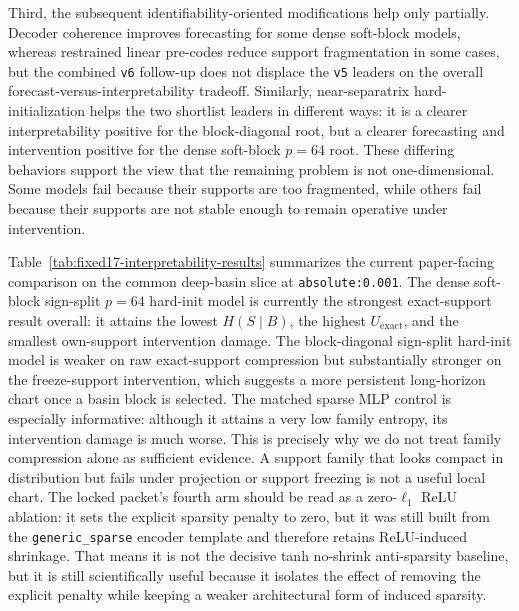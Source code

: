 Third, the subsequent identifiability-oriented modifications help only
partially. Decoder coherence improves forecasting for some dense soft-block
models, whereas restrained linear pre-codes reduce support fragmentation in
some cases, but the combined \texttt{v6} follow-up does not displace the
\texttt{v5} leaders on the overall forecast-versus-interpretability tradeoff.
Similarly, near-separatrix hard-initialization helps the two shortlist leaders
in different ways: it is a clearer interpretability positive for the
block-diagonal root, but a clearer forecasting and intervention positive for
the dense soft-block $p=64$ root. These differing behaviors support the view
that the remaining problem is not one-dimensional. Some models fail because
their supports are too fragmented, while others fail because their supports are
not stable enough to remain operative under intervention.

Table~\ref{tab:fixed17-interpretability-results} summarizes the current
paper-facing comparison on the common deep-basin slice at
\texttt{absolute:0.001}. The dense soft-block sign-split $p=64$ hard-init
model is currently the strongest exact-support result overall: it attains the
lowest $H(S \mid B)$, the highest $U_{\mathrm{exact}}$, and the smallest
own-support intervention damage. The block-diagonal sign-split hard-init model
is weaker on raw exact-support compression but substantially stronger on the
freeze-support intervention, which suggests a more persistent long-horizon
chart once a basin block is selected. The matched sparse MLP control is
especially informative: although it attains a very low family entropy, its
intervention damage is much worse. This is precisely why we do not treat
family compression alone as sufficient evidence. A support family that looks
compact in distribution but fails under projection or support freezing is not a
useful local chart. The locked packet's fourth arm should be read as a
zero-$\ell_1$ ReLU ablation: it sets the explicit sparsity penalty to zero, but
it was still built from the \texttt{generic\_sparse} encoder template and
therefore retains ReLU-induced shrinkage. That means it is not the decisive
tanh no-shrink anti-sparsity baseline, but it is still scientifically useful
because it isolates the effect of removing the explicit penalty while keeping a
weaker architectural form of induced sparsity.

